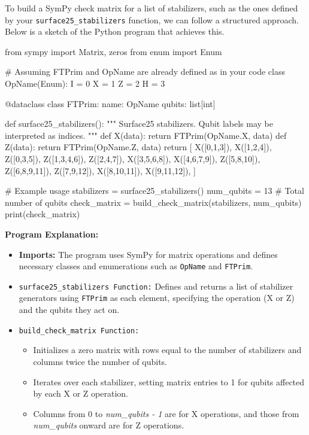 \begin{airesult}
To build a SymPy check matrix for a list of stabilizers, such as the ones defined by your
\verb|surface25_stabilizers| function, we can follow a structured approach. Below is a sketch of the
Python program that achieves this.

\vsp

\begin{python}
from sympy import Matrix, zeros
from enum import Enum

# Assuming FTPrim and OpName are already defined as in your code
class OpName(Enum):
  I = 0
  X = 1
  Z = 2
  H = 3

@dataclass
class FTPrim:
  name: OpName
  qubits: list[int]

def surface25_stabilizers():
  """ Surface25 stabilizers. Qubit labels may be interpreted as indices. """
  def X(data):
    return FTPrim(OpName.X, data)
  def Z(data):
    return FTPrim(OpName.Z, data)
  return [
            X([0,1,3]), X([1,2,4]),
    Z([0,3,5]), Z([1,3,4,6]), Z([2,4,7]),
           X([3,5,6,8]), X([4,6,7,9]),
    Z([5,8,10]), Z([6,8,9,11]), Z([7,9,12]),
           X([8,10,11]), X([9,11,12]),
  ]

# Example usage
stabilizers = surface25_stabilizers()
num_qubits = 13  # Total number of qubits
check_matrix = build_check_matrix(stabilizers, num_qubits)
print(check_matrix)
\end{python}

\vsp

\textbf{Program Explanation:}

\begin{itemize}
  \item \textbf{Imports:} The program uses SymPy for matrix operations and defines necessary classes
        and enumerations such as \verb|OpName| and \verb|FTPrim|.

  \item \verb|surface25_stabilizers Function:| Defines and returns a list of stabilizer generators
        using \verb|FTPrim| as each element, specifying the operation (X or Z) and the qubits they
        act on.

  \item \verb|build_check_matrix Function:|
  \begin{itemize}
    \item Initializes a zero matrix with rows equal to the number of stabilizers and columns twice
          the number of qubits.
    \item Iterates over each stabilizer, setting matrix entries to 1 for qubits affected by each X
          or Z operation.
    \item Columns from 0 to \textit{num\_qubits - 1} are for X operations, and those from
          \textit{num\_qubits} onward are for Z operations.
  \end{itemize}


\end{itemize}
\end{airesult}
